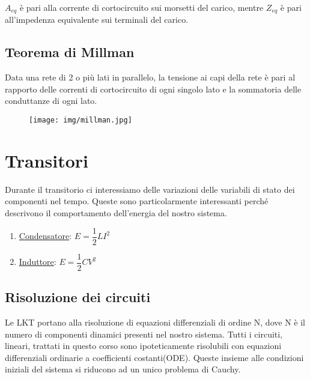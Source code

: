 \documentclass{article}
\begin{document}
\noindent $A_{eq}$ è pari alla corrente di cortocircuito sui morsetti del carico, mentre $Z_{eq}$ è pari all'impedenza equivalente sui
terminali del carico.

\subsection{Teorema di Millman}
Data una rete di 2 o più lati in parallelo, la tensione ai capi della rete è pari al rapporto delle correnti di cortocircuito di ogni singolo lato
e la sommatoria delle conduttanze di ogni lato.


\medskip
\noindent{}

\begin{figure}[h!]
    \begin{center}
        \texttt{[image: img/millman.jpg]}
    \end{center}
\end{figure}
\pagebreak

\section{Transitori}
\noindent Durante il transitorio ci interessiamo delle variazioni delle variabili di stato dei componenti nel tempo. 
Queste sono particolarmente interessanti perché descrivono il comportamento dell'energia del nostro sistema.

\begin{enumerate}
    \item \underline{Condensatore}: $E=\dfrac{1}{2}LI^2$
    \item \underline{Induttore}: $E=\dfrac{1}{2}CV^2$
\end{enumerate}

\medskip
\noindent{}
\medskip

\subsection{Risoluzione dei circuiti}
\noindent Le LKT portano alla risoluzione di equazioni differenziali di ordine N, dove N è il numero di componenti dinamici presenti nel 
nostro sistema. Tutti i circuiti, lineari, trattati in questo corso sono ipoteticamente risolubili con equazioni differenziali ordinarie
a coefficienti costanti(ODE). Queste insieme alle condizioni iniziali del sistema si riducono ad un unico problema di Cauchy.
\end{document}
